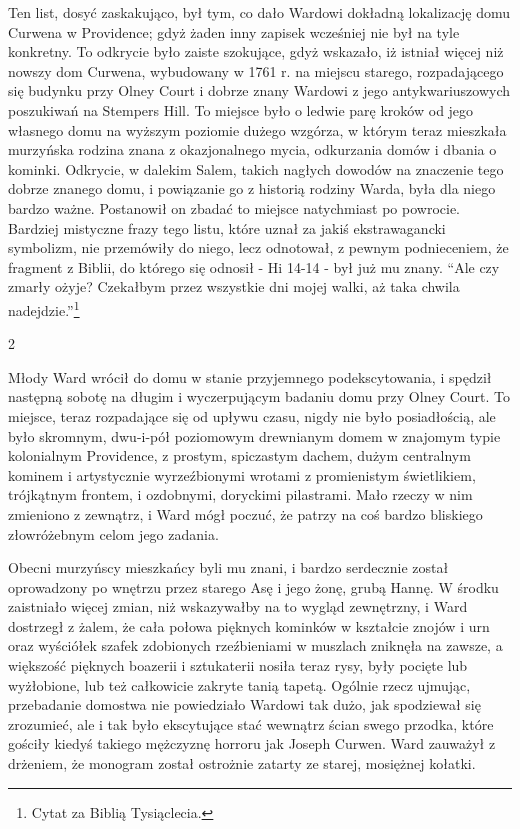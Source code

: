 Ten list, dosyć zaskakująco, był tym, co dało Wardowi dokładną lokalizację domu Curwena w Providence; gdyż żaden inny zapisek wcześniej nie był na tyle konkretny. To odkrycie było zaiste szokujące, gdyż wskazało, iż istniał więcej niż nowszy dom Curwena, wybudowany w 1761 r. na miejscu starego, rozpadającego się budynku przy Olney Court i dobrze znany Wardowi z jego antykwariuszowych poszukiwań na Stempers Hill. To miejsce było o ledwie parę kroków od jego własnego domu na wyższym poziomie dużego wzgórza, w którym teraz mieszkała murzyńska rodzina znana z okazjonalnego mycia, odkurzania domów i dbania o kominki. Odkrycie, w dalekim Salem, takich nagłych dowodów na znaczenie tego dobrze znanego domu, i powiązanie go z historią rodziny Warda, była dla niego bardzo ważne. Postanowił on zbadać to miejsce natychmiast po powrocie. Bardziej mistyczne frazy tego listu, które uznał za jakiś ekstrawagancki symbolizm, nie przemówiły do niego, lecz odnotował, z pewnym podnieceniem, że fragment z Biblii, do którego się odnosił - Hi 14-14 - był już mu znany. ``Ale czy zmarły ożyje? Czekałbym przez wszystkie dni mojej walki, aż taka chwila nadejdzie.''\footnote{Cytat za Biblią Tysiąclecia.}

\begin{center}
2
\end{center}

Młody Ward wrócił do domu w stanie przyjemnego podekscytowania, i spędził następną sobotę na długim i wyczerpującym badaniu domu przy Olney Court. To miejsce, teraz rozpadające się od upływu czasu, nigdy nie było posiadłością, ale było skromnym, dwu-i-pół poziomowym drewnianym domem w znajomym typie kolonialnym Providence, z prostym, spiczastym dachem, dużym centralnym kominem i artystycznie wyrzeźbionymi wrotami z promienistym świetlikiem, trójkątnym frontem, i ozdobnymi, doryckimi pilastrami. Mało rzeczy w nim zmieniono z zewnątrz, i Ward mógł poczuć, że patrzy na coś bardzo bliskiego złowróżebnym celom jego zadania.

Obecni murzyńscy mieszkańcy byli mu znani, i bardzo serdecznie został oprowadzony po wnętrzu przez starego Asę i jego żonę, grubą Hannę. W środku zaistniało więcej zmian, niż wskazywałby na to wygląd zewnętrzny, i Ward dostrzegł z żalem, że cała połowa pięknych kominków w kształcie znojów i urn oraz wyściółek szafek zdobionych rzeźbieniami w muszlach zniknęła na zawsze, a większość pięknych boazerii i sztukaterii nosiła teraz rysy, były pocięte lub wyżłobione, lub też całkowicie zakryte tanią tapetą. Ogólnie rzecz ujmując, przebadanie domostwa nie powiedziało Wardowi tak dużo, jak spodziewał się zrozumieć, ale i tak było ekscytujące stać wewnątrz ścian swego przodka, które gościły kiedyś takiego mężczyznę horroru jak Joseph Curwen. Ward zauważył z drżeniem, że monogram został ostrożnie zatarty ze starej, mosiężnej kołatki.   

